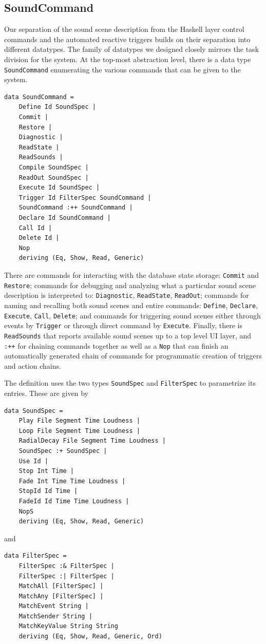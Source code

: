 \subsection{SoundCommand}
\label{sec:soundspec}

Our separation of the sound scene description from the Haskell layer
control commands and the automated reactive triggers builds on their
separation into different datatypes. 
The family of datatypes we designed closely mirrors the task division
for the system. 
At the top-most abstraction
level, there is a data type \texttt{SoundCommand} enumerating the
various commands that can be given to the system. 

\begin{verbatim}
data SoundCommand = 
    Define Id SoundSpec |
    Commit | 
    Restore | 
    Diagnostic |
    ReadState |
    ReadSounds | 
    Compile SoundSpec |
    ReadOut SoundSpec | 
    Execute Id SoundSpec |
    Trigger Id FilterSpec SoundCommand |
    SoundCommand :++ SoundCommand |
    Declare Id SoundCommand |
    Call Id | 
    Delete Id | 
    Nop
    deriving (Eq, Show, Read, Generic)
\end{verbatim}

There are commands for interacting with the database state storage:
\texttt{Commit} and \texttt{Restore}; commands for debugging and
analyzing what a particular sound scene description is interpreted to:
\texttt{Diagnostic}, \texttt{ReadState}, \texttt{ReadOut}; commands
for naming and recalling both sound scenes and entire commands:
\texttt{Define}, \texttt{Declare}, \texttt{Execute}, \texttt{Call},
\texttt{Delete}; and commands for triggering sound scenes either
through events by \texttt{Trigger} or through direct command by
\texttt{Execute}. Finally, there is \texttt{ReadSounds} that reports
available sound scenes up to a top level UI layer, and
\texttt{:++} for chaining commands together as well as a \texttt{Nop}
that can finish an automatically generated chain of commands for
programmatic creation of triggers and action chains. 

The definition uses the two types \texttt{SoundSpec} and
\texttt{FilterSpec} to parametrize its entries. These are given by

\begin{verbatim}
data SoundSpec = 
    Play File Segment Time Loudness |
    Loop File Segment Time Loudness |
    RadialDecay File Segment Time Loudness | 
    SoundSpec :+ SoundSpec | 
    Use Id |
    Stop Int Time |
    Fade Int Time Time Loudness |
    StopId Id Time |
    FadeId Id Time Time Loudness |
    NopS
    deriving (Eq, Show, Read, Generic)
\end{verbatim}
and
\begin{verbatim}
data FilterSpec = 
    FilterSpec :& FilterSpec |
    FilterSpec :| FilterSpec |
    MatchAll [FilterSpec] |
    MatchAny [FilterSpec] |
    MatchEvent String |
    MatchSender String |
    MatchKeyValue String String
    deriving (Eq, Show, Read, Generic, Ord)
\end{verbatim}

